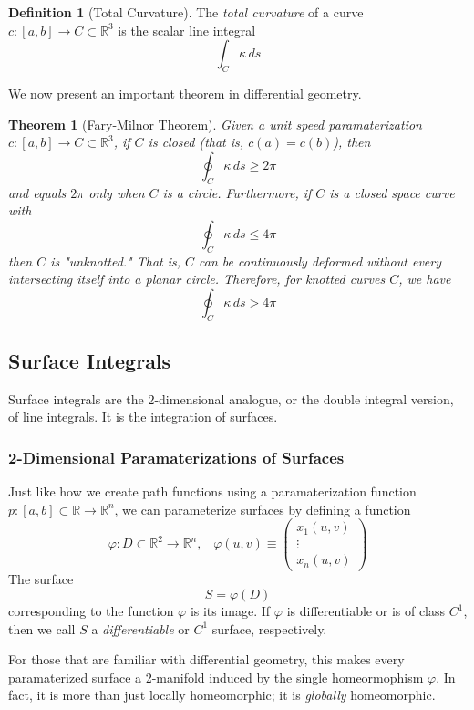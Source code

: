 \documentclass{article}
\newtheorem{theorem}{Theorem}[section]
\theoremstyle{remark}
\theoremstyle{definition}
\newtheorem{definition}{Definition}[section]
\begin{document}
\begin{definition}[Total Curvature]
The \textit{total curvature} of a curve $c: [a,b] \longrightarrow C \subset \mathbb{R}^3$ is the scalar line integral 
\[\int_C \kappa \, ds\]
\end{definition}

We now present an important theorem in differential geometry. 
\begin{theorem}[Fary-Milnor Theorem]
Given a unit speed paramaterization $c: [a,b] \longrightarrow C \subset \mathbb{R}^3$, if $C$ is closed (that is, $c(a)=c(b)$), then 
\[\oint_C \kappa\, ds \geq 2 \pi\]
and equals $2\pi$ only when $C$ is a circle. Furthermore, if $C$ is a closed space curve with 
\[\oint_C \kappa\, ds \leq 4\pi\]
then $C$ is "unknotted." That is, $C$ can be continuously deformed without every intersecting itself into a planar circle. Therefore, for knotted curves $C$, we have
\[\oint_C \kappa \, ds > 4\pi\]
\end{theorem}

\subsection{Surface Integrals}
Surface integrals are the $2$-dimensional analogue, or the double integral version, of line integrals. It is the integration of surfaces. 

\subsubsection{2-Dimensional Paramaterizations of Surfaces}
Just like how we create path functions using a paramaterization function $p: [a, b] \subset \mathbb{R} \longrightarrow \mathbb{R}^n$, we can parameterize surfaces by defining a function 
\[\varphi: D \subset \mathbb{R}^2 \longrightarrow \mathbb{R}^n, \;\;\; \varphi (u, v) \equiv \begin{pmatrix} x_1 (u, v) \\ \vdots \\ x_n (u, v) \end{pmatrix}\]
The surface 
\[S = \varphi(D)\]
corresponding to the function $\varphi$ is its image. If $\varphi$ is differentiable or is of class $C^1$, then we call $S$ a \textit{differentiable} or $C^1$ surface, respectively. 

For those that are familiar with differential geometry, this makes every paramaterized surface a 2-manifold induced by the single homeormophism $\varphi$. In fact, it is more than just locally homeomorphic; it is \textit{globally} homeomorphic. 
\end{document}
